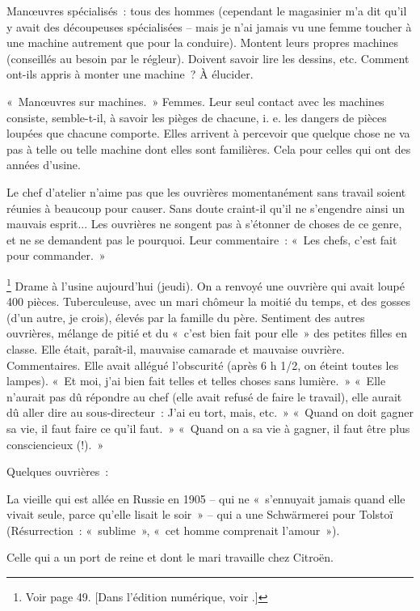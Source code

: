 \documentclass[french,twoside]{book} %
\begin{document}
Manœuvres spécialisés : tous des hommes (cependant le magasinier m'a dit qu'il y avait des découpeuses spécialisées – mais je n'ai jamais vu une femme toucher à une machine autrement que pour la conduire). Montent leurs propres machines (conseillés au besoin par le régleur). Doivent savoir lire les dessins, etc. Comment ont-ils appris à monter une machine ? À élucider.\par
« Manœuvres sur machines. » Femmes. Leur seul contact avec les machines consiste, semble-t-il, à savoir les pièges de chacune, i. e. les dangers de pièces loupées que chacune comporte. Elles arrivent à percevoir que quelque chose ne va pas à telle ou telle machine dont elles sont familières. Cela pour celles qui ont des années d'usine.\par
Le chef d'atelier n'aime pas que les ouvrières momentanément sans travail soient réunies à beaucoup pour causer. Sans doute craint-il qu'il ne s'engendre ainsi un mauvais esprit... Les ouvrières ne songent pas à s'étonner de choses de ce genre, et ne se demandent pas le pourquoi. Leur commentaire : « Les chefs, c'est fait pour commander. »\par
\footnote{ Voir page 49. [Dans l’édition numérique, voir \hyperref[condition_ouvriËre_V_sem_II]{}.]} Drame à l'usine aujourd'hui (jeudi). On a renvoyé une ouvrière qui avait loupé 400 pièces. Tuberculeuse, avec un mari chômeur la moitié du temps, et des gosses (d'un autre, je crois), élevés par la famille du père. Sentiment des autres ouvrières, mélange de pitié et du « c'est bien fait pour elle » des petites filles en classe. Elle était, paraît-il, mauvaise camarade et mauvaise ouvrière. Commentaires. Elle avait allégué l'obscurité (après 6 h 1/2, on éteint toutes les lampes). « Et moi, j'ai bien fait telles et telles choses sans lumière. » « Elle n'aurait pas dû répondre au chef (elle avait refusé de faire le travail), elle aurait dû aller dire au sous-directeur : J'ai eu tort, mais, etc. » « Quand on doit gagner sa vie, il faut faire ce qu'il faut. » « Quand on a sa vie à gagner, il faut être plus consciencieux (!). »\par
Quelques ouvrières :\par
La vieille qui est allée en Russie en 1905 – qui ne « s'ennuyait jamais quand elle vivait seule, parce qu'elle lisait le soir » – qui a une Schwärmerei pour Tolstoï (Résurrection : « sublime », « cet homme comprenait l'amour »).\par
Celle qui a un port de reine et dont le mari travaille chez Citroën.\par
\end{document}
